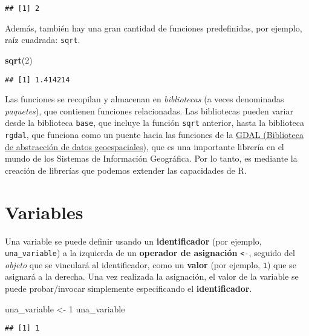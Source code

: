 \documentclass[
]{book}
\newenvironment{Shaded}{\begin{snugshade}}{\end{snugshade}}
\newcommand{\DecValTok}[1]{\textcolor[rgb]{0.00,0.00,0.81}{#1}}
\newcommand{\KeywordTok}[1]{\textcolor[rgb]{0.13,0.29,0.53}{\textbf{#1}}}
\newcommand{\NormalTok}[1]{#1}
\newcommand{\StringTok}[1]{\textcolor[rgb]{0.31,0.60,0.02}{#1}}
\begin{document}
\begin{verbatim}
## [1] 2
\end{verbatim}

Además, también hay una gran cantidad de funciones predefinidas, por ejemplo, raíz cuadrada: \texttt{sqrt}.

\begin{Shaded}
\begin{Highlighting}[]
\KeywordTok{sqrt}\NormalTok{(}\DecValTok{2}\NormalTok{)}
\end{Highlighting}
\end{Shaded}

\begin{verbatim}
## [1] 1.414214
\end{verbatim}

Las funciones se recopilan y almacenan en \emph{bibliotecas} (a veces denominadas \emph{paquetes}), que contienen funciones relacionadas. Las bibliotecas pueden variar desde la biblioteca \texttt{base}, que incluye la función \texttt{sqrt} anterior, hasta la biblioteca \texttt{rgdal}, que funciona como un puente hacia las funciones de la \href{https://gdal.org/}{GDAL (Biblioteca de abstracción de datos geoespaciales)}, que es una importante librería en el mundo de los Sistemas de Información Geográfica. Por lo tanto, es mediante la creación de librerías que podemos extender las capacidades de R.

\hypertarget{variables}{%
\section{Variables}\label{variables}}

Una variable se puede definir usando un \textbf{identificador} (por ejemplo, \texttt{una\_variable}) a la izquierda de un \textbf{operador de asignación} \texttt{\textless{}-}, seguido del \emph{objeto} que se vinculará al identificador, como un \textbf{valor} (por ejemplo, \texttt{1}) que se asignará a la derecha. Una vez realizada la asignación, el valor de la variable se puede probar/invocar simplemente especificando el \textbf{identificador}.

\begin{Shaded}
\begin{Highlighting}[]
\NormalTok{una_variable <-}\StringTok{ }\DecValTok{1}
\NormalTok{una_variable}
\end{Highlighting}
\end{Shaded}

\begin{verbatim}
## [1] 1
\end{verbatim}
\end{document}
